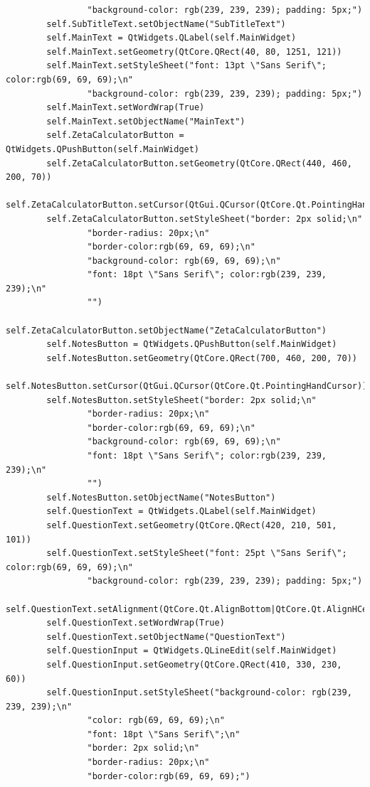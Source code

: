 \documentclass{article}
\begin{document}
\begin{lstlisting}
                "background-color: rgb(239, 239, 239); padding: 5px;")
        self.SubTitleText.setObjectName("SubTitleText")
        self.MainText = QtWidgets.QLabel(self.MainWidget)
        self.MainText.setGeometry(QtCore.QRect(40, 80, 1251, 121))
        self.MainText.setStyleSheet("font: 13pt \"Sans Serif\"; color:rgb(69, 69, 69);\n"
                "background-color: rgb(239, 239, 239); padding: 5px;")
        self.MainText.setWordWrap(True)
        self.MainText.setObjectName("MainText")
        self.ZetaCalculatorButton = QtWidgets.QPushButton(self.MainWidget)
        self.ZetaCalculatorButton.setGeometry(QtCore.QRect(440, 460, 200, 70))
        self.ZetaCalculatorButton.setCursor(QtGui.QCursor(QtCore.Qt.PointingHandCursor))
        self.ZetaCalculatorButton.setStyleSheet("border: 2px solid;\n"
                "border-radius: 20px;\n"
                "border-color:rgb(69, 69, 69);\n"
                "background-color: rgb(69, 69, 69);\n"
                "font: 18pt \"Sans Serif\"; color:rgb(239, 239, 239);\n"
                "")
        self.ZetaCalculatorButton.setObjectName("ZetaCalculatorButton")
        self.NotesButton = QtWidgets.QPushButton(self.MainWidget)
        self.NotesButton.setGeometry(QtCore.QRect(700, 460, 200, 70))
        self.NotesButton.setCursor(QtGui.QCursor(QtCore.Qt.PointingHandCursor))
        self.NotesButton.setStyleSheet("border: 2px solid;\n"
                "border-radius: 20px;\n"
                "border-color:rgb(69, 69, 69);\n"
                "background-color: rgb(69, 69, 69);\n"
                "font: 18pt \"Sans Serif\"; color:rgb(239, 239, 239);\n"
                "")
        self.NotesButton.setObjectName("NotesButton")
        self.QuestionText = QtWidgets.QLabel(self.MainWidget)
        self.QuestionText.setGeometry(QtCore.QRect(420, 210, 501, 101))
        self.QuestionText.setStyleSheet("font: 25pt \"Sans Serif\"; color:rgb(69, 69, 69);\n"
                "background-color: rgb(239, 239, 239); padding: 5px;")
        self.QuestionText.setAlignment(QtCore.Qt.AlignBottom|QtCore.Qt.AlignHCenter)
        self.QuestionText.setWordWrap(True)
        self.QuestionText.setObjectName("QuestionText")
        self.QuestionInput = QtWidgets.QLineEdit(self.MainWidget)
        self.QuestionInput.setGeometry(QtCore.QRect(410, 330, 230, 60))
        self.QuestionInput.setStyleSheet("background-color: rgb(239, 239, 239);\n"
                "color: rgb(69, 69, 69);\n"
                "font: 18pt \"Sans Serif\";\n"
                "border: 2px solid;\n"
                "border-radius: 20px;\n"
                "border-color:rgb(69, 69, 69);")

\end{lstlisting}
\end{document}
